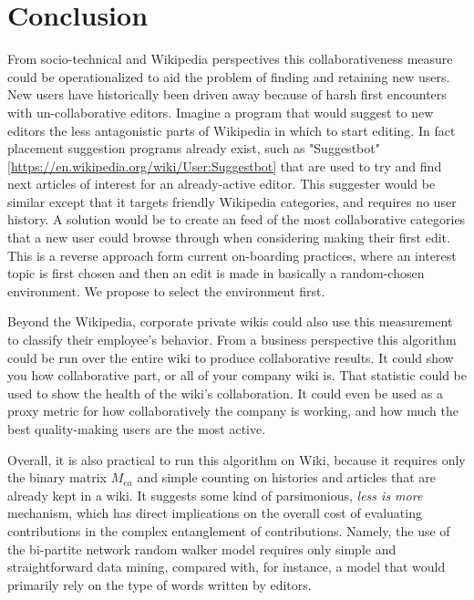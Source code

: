 \section{Conclusion}
From socio-technical and Wikipedia perspectives this collaborativeness measure could be operationalized to aid the problem of finding and retaining new users. New users have historically been driven away because of harsh first encounters with un-collaborative editors. Imagine a program that would suggest to new editors the less antagonistic parts of Wikipedia in which to start editing. In fact placement suggestion programs already exist, such as "Suggestbot" \ref{https://en.wikipedia.org/wiki/User:Suggestbot} that are used to try and find next articles of interest for an already-active editor. This suggester would be similar except that it targets friendly Wikipedia categories, and requires no user history. A solution would be to create an feed of the most collaborative categories that a new user could browse through when considering making their first edit. This is a reverse approach form current on-boarding practices, where an interest topic is first chosen and then an edit is made in basically a random-chosen environment. We propose to select the environment first.

Beyond the Wikipedia, corporate private wikis could also use this measurement to classify their employee's behavior. From a business perspective this algorithm could be run over the entire wiki to produce collaborative results. It could show you how collaborative part, or all of your company wiki is. That statistic could be used to show the health of the wiki's collaboration. It could even be used as a proxy metric for how collaboratively the company is working, and how much the best quality-making users are the most active.


Overall, it is also practical to run this algorithm on Wiki, because it requires only the binary matrix $M_{ea}$ and simple counting on histories and articles that are already kept in a wiki. It suggests some kind of parsimonious, {\it less is more} mechanism, which has direct implications on the overall cost of evaluating contributions in the complex entanglement of contributions. Namely, the use of the bi-partite network random walker model requires only simple and straightforward data mining, compared with, for instance, a model that would primarily rely on the type of words written by editors.

